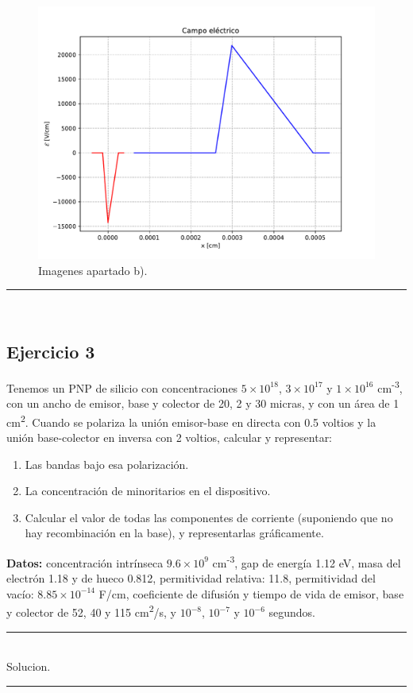 \begin{enumerate}[label=\alph*)]
\begin{figure}[h!]
        \includegraphics[width=0.48\linewidth]{Cuerpo/Ch_04/04_Ejercicio-2-04.pdf}
        \caption{Imagenes apartado b).}
    \end{figure}

\end{enumerate}

\rule{\textwidth}{0.1pt} \\[2pt]


\subsection{Ejercicio 3} 

Tenemos un PNP de silicio con concentraciones $5 \times 10^{18}$, $3 \times 10^{17}$ y $1 \times 10^{16}$ cm\textsuperscript{-3}, con un ancho de emisor, base y colector de 20, 2 y 30 micras, y con un área de 1 cm\textsuperscript{2}. Cuando se polariza la unión emisor-base en directa con 0.5 voltios y la unión base-colector en inversa con 2 voltios, calcular y representar:
\begin{enumerate}[label=\alph*)]
    \item Las bandas bajo esa polarización.
    \item La concentración de minoritarios en el dispositivo.
    \item Calcular el valor de todas las componentes de corriente (suponiendo que no hay recombinación en la base), y representarlas gráficamente.
\end{enumerate}
\textbf{Datos:} concentración intrínseca $9.6 \times 10^9$ cm\textsuperscript{-3}, gap de energía 1.12 eV, masa del electrón 1.18 y de hueco 0.812, permitividad relativa: 11.8, permitividad del vacío: $8.85 \times 10^{-14}$ F/cm, coeficiente de difusión y tiempo de vida de emisor, base y colector de 52, 40 y 115 cm\textsuperscript{2}/s, y $10^{-8}$, $10^{-7}$ y $10^{-6}$ segundos.

\rule{\textwidth}{0.1pt} \\[2pt]

Solucion.

\rule{\textwidth}{0.1pt} \\[2pt]
